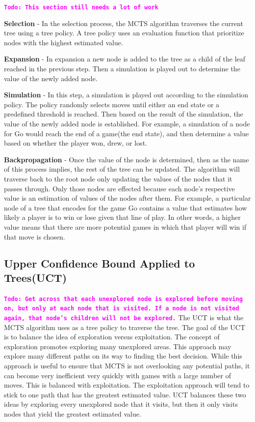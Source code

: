 \documentclass{sig-alternate}
\newcommand{\comment}[1]{{\bf \tt  {#1}}}
\newcommand{\todo}[1]{\textcolor{magenta}{\comment{Todo: {#1}}}}
\begin{document}
\todo{This section still needs a lot of work}

\textbf{Selection} - In the selection process, the MCTS algorithm traverses the current tree using a tree policy. A tree policy uses an evaluation function that prioritize nodes with the highest estimated value. 

\textbf{Expansion} - In expansion a new node is added to the tree as a child of the leaf reached in the previous step. Then a simulation is played out to determine the value of the newly added node.

\textbf{Simulation} - In this step, a simulation is played out according to the simulation policy. The policy randomly selects moves until either an end state or a predefined threshold is reached. Then based on the result of the simulation, the value of the newly added node is established. For example, a simulation of a node for Go would reach the end of a game(the end state), and then determine a value based on whether the player won, drew, or lost.

\textbf{Backpropagation} - Once the value of the node is determined, then as the name of this process implies, the rest of the tree can be updated. The algorithm will traverse back to the root node only updating the values of the nodes that it passes through. Only those nodes are effected because each node's respective value is an estimation of values of the nodes after them. For example, a particular node of a tree that encodes for the game Go contains a value that estimates how likely a player is to win or lose given that line of play. In other words, a higher value means that there are more potential games in which that player will win if that move is chosen.

\subsection{Upper Confidence Bound Applied to Trees(UCT)}
\todo{Get across that each unexplored node is explored before moving on, but only at each node that is visited. If a node is not visited again, that node's children will not be explored.}
The UCT is what the MCTS algorithm uses as a tree policy to traverse the tree. The goal of the UCT is to balance the idea of exploration versus exploitation. The concept of exploration promotes exploring many unexplored areas. This approach may explore many different paths on its way to finding the best decision. While this approach is useful to ensure that MCTS is not overlooking any potential paths, it can become very inefficient very quickly with games with a large number of moves. This is balanced with exploitation. The exploitation approach will tend to stick to one path that has the greatest estimated value. UCT balances these two ideas by exploring every unexplored node that it visits, but then it only visits nodes that yield the greatest estimated value.
\end{document}
